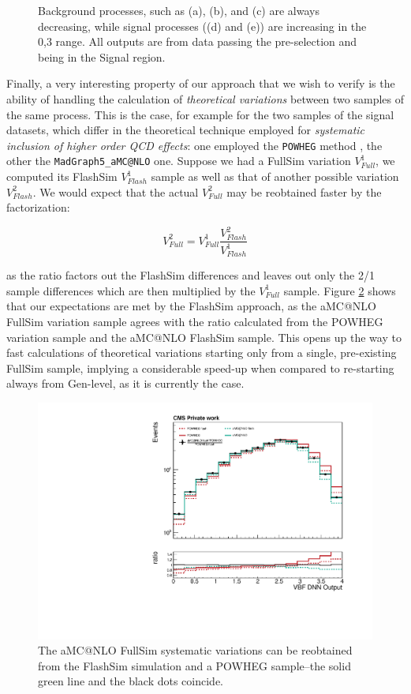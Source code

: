 \begin{figure}
    \caption[Angular distributions]{Background processes, such as (a), (b), and (c) are always decreasing, while signal processes ((d) and (e)) are increasing in the 0,3 range. All outputs are from data passing the pre-selection and being in the Signal region. }\label{fig:DNNout}
\end{figure}

Finally, a very interesting property of our approach that we wish to verify is the ability of handling the calculation of \emph{theoretical variations} between two samples of the same process. This is the case, for example for the two samples of the signal datasets, which differ in the theoretical technique employed for \emph{systematic inclusion of higher order QCD effects}: one employed the \texttt{POWHEG} method \cite{Nason_2004}, the other the \texttt{MadGraph5\_aMC@NLO} \cite{powpow} one. Suppose we had a FullSim variation $V^1_{Full}$, we computed its FlashSim $V^1_{Flash}$ sample as well as that of another possible variation $V^2_{Flash}$. We would expect that the actual $V^2_{Full}$ may be reobtained faster by the factorization:

\[V^2_{Full} = V^1_{Full} \frac{V^2_{Flash}}{V^1_{Flash}}
\]

as the ratio factors out the FlashSim differences and leaves out only the 2/1 sample differences which are then multiplied by the $V^1_{Full}$ sample. Figure \ref{fig:sysvar} shows that our expectations are met by the FlashSim approach, as the aMC@NLO FullSim variation sample agrees with the ratio calculated from the POWHEG variation sample and the aMC@NLO FlashSim sample. This opens up the way to fast calculations of theoretical variations starting only from a single, pre-existing FullSim sample, implying a considerable speed-up when compared to re-starting always from Gen-level, as it is currently the case.

\begin{figure}
    \centering
    \includegraphics[width=\linewidth]{gfx/ch6/systematic_production.pdf}
    \caption[Systematic production]{The aMC@NLO FullSim systematic variations can be reobtained from the FlashSim simulation and a POWHEG sample--the solid green line and the black dots coincide.}
    \label{fig:sysvar}
\end{figure}

